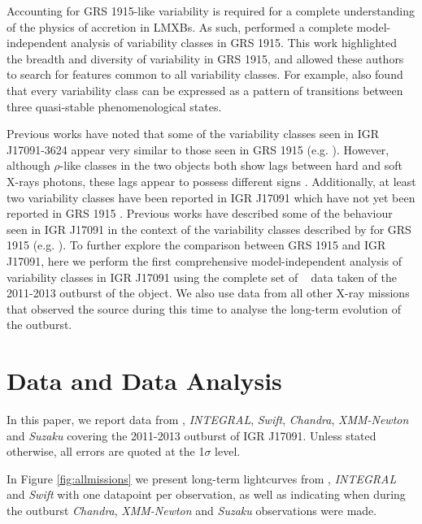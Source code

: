 \par Accounting for GRS 1915-like variability is required for a complete understanding of the physics of accretion in LMXBs.  As such, \citet{Belloni_GRS_MI} performed a complete model-independent analysis of variability classes in GRS 1915.  This work highlighted the breadth and diversity of variability in GRS 1915, and allowed these authors to search for features common to all variability classes.  For example, \citet{Belloni_GRS_MI} also found that every variability class can be expressed as a pattern of transitions between three quasi-stable phenomenological states.
\par Previous works have noted that some of the variability classes seen in IGR J17091-3624 appear very similar to those seen in GRS 1915 (e.g. \citealp{Altamirano_IGR_FH, Zhang_IGR}).  However, although $\rho$-like classes in the two objects both show lags between hard and soft X-rays photons, these lags appear to possess different signs \citep{Altamirano_IGR_FH}.  Additionally, at least two variability classes have been reported in IGR J17091 which have not yet been reported in GRS 1915 \citep{Pahari_IGRClasses}.  Previous works have described some of the behaviour seen in IGR J17091 in the context of the variability classes described by \citealt{Belloni_GRS_MI} for GRS 1915 (e.g. \citealp{Altamirano_IGR_FH,Pahari_RhoDiff}).  To further explore the comparison between GRS 1915 and IGR J17091, here we perform the first comprehensive model-independent analysis of variability classes in IGR J17091 using the complete set of \rxte\ \citep{Bradt_RXTE} data taken of the 2011-2013 outburst of the object.  We also use data from all other X-ray missions that observed the source during this time to analyse the long-term evolution of the outburst.

\section{Data and Data Analysis}

\label{sec:dex}

\par In this paper, we report data from \rxte , \textit{INTEGRAL}, \textit{Swift}, \textit{Chandra}, \textit{XMM-Newton} and \textit{Suzaku} covering the 2011-2013 outburst of IGR J17091.  Unless stated otherwise, all errors are quoted at the 1$\sigma$ level.
\par In Figure \ref{fig:allmissions} we present long-term lightcurves from \rxte ,  \textit{INTEGRAL} and \textit{Swift} with one datapoint per observation, as well as indicating when during the outburst \textit{Chandra}, \textit{XMM-Newton} and \textit{Suzaku} observations were made.

